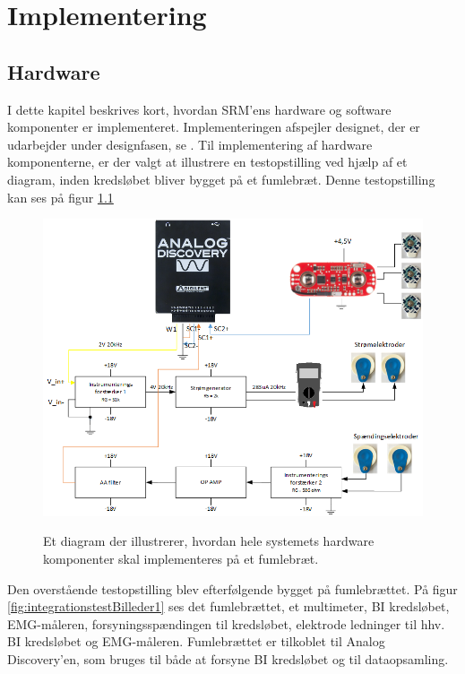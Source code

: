 \chapter{Implementering}

\section{Hardware}
I dette kapitel beskrives kort, hvordan SRM'ens hardware og software komponenter er implementeret. Implementeringen afspejler designet, der er udarbejder under designfasen, se .  Til implementering af hardware komponenterne, er der valgt at illustrere en testopstilling ved hjælp af et diagram, inden kredsløbet bliver bygget på et fumlebræt. Denne testopstilling kan ses på figur \ref{fig:integrationstestDiagram}

\begin{figure}[H] 
\centering
{\includegraphics[width=\linewidth]
{Figure/integrationstestDiagram}}
\caption{Et diagram der illustrerer, hvordan hele systemets hardware komponenter skal implementeres på et fumlebræt. }
\label{fig:integrationstestDiagram}
\end{figure}

\pagebreak
Den overstående testopstilling blev efterfølgende bygget på fumlebrættet. På figur \ref{fig:integrationstestBilleder1} ses det fumlebrættet, et multimeter,  BI kredsløbet, EMG-måleren, forsyningsspændingen til kredsløbet, elektrode ledninger til hhv. BI kredsløbet og EMG-måleren. Fumlebrættet er tilkoblet til Analog Discovery'en, som bruges til både at forsyne BI kredsløbet og til dataopsamling. 



